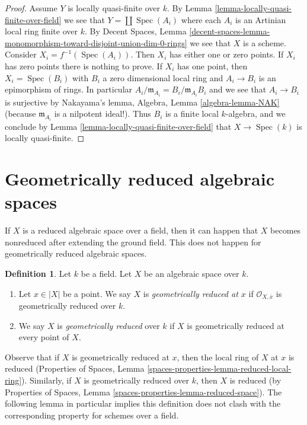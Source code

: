 \documentclass{stacks-project}
\theoremstyle{plain}
\theoremstyle{definition}
\newtheorem{definition}[subsection]{Definition}
\theoremstyle{remark}
\numberwithin{equation}{subsection}
\def\Spec{\mathop{\mathrm{Spec}}}
\begin{document}
\begin{proof}
Assume $Y$ is locally quasi-finite over $k$. By
Lemma \ref{lemma-locally-quasi-finite-over-field}
we see that $Y = \coprod \Spec(A_i)$ where each $A_i$ is an
Artinian local ring finite over $k$. By
Decent Spaces, Lemma
\ref{decent-spaces-lemma-monomorphism-toward-disjoint-union-dim-0-rings}
we see that $X$ is a scheme. Consider $X_i = f^{-1}(\Spec(A_i))$.
Then $X_i$ has either one or zero points. If $X_i$ has zero points there
is nothing to prove. If $X_i$ has one point, then
$X_i = \Spec(B_i)$ with $B_i$ a zero dimensional local ring
and $A_i \to B_i$ is an epimorphism of rings. In particular
$A_i/\mathfrak m_{A_i} = B_i/\mathfrak m_{A_i}B_i$ and we see that
$A_i \to B_i$ is surjective by Nakayama's lemma,
Algebra, Lemma \ref{algebra-lemma-NAK}
(because $\mathfrak m_{A_i}$ is a nilpotent ideal!).
Thus $B_i$ is a finite local $k$-algebra, and we conclude by
Lemma \ref{lemma-locally-quasi-finite-over-field}
that $X \to \Spec(k)$ is locally quasi-finite.
\end{proof}











\section{Geometrically reduced algebraic spaces}
\label{section-geometrically-reduced}

\noindent
If $X$ is a reduced algebraic space over a field, then it can happen that $X$
becomes nonreduced after extending the ground field. This does not happen
for geometrically reduced algebraic spaces.

\begin{definition}
\label{definition-geometrically-reduced}
Let $k$ be a field.
Let $X$ be an algebraic space over $k$.
\begin{enumerate}
\item Let $x \in |X|$ be a point. We say $X$ is
{\it geometrically reduced at $x$} if $\mathcal{O}_{X, \overline{x}}$
is geometrically reduced over $k$.
\item We say $X$ is {\it geometrically reduced} over $k$
if $X$ is geometrically reduced at every point of $X$.
\end{enumerate}
\end{definition}

\noindent
Observe that if $X$ is geometrically reduced at $x$, then the local
ring of $X$ at $x$ is reduced (Properties of Spaces, Lemma
\ref{spaces-properties-lemma-reduced-local-ring}).
Similarly, if $X$ is geometrically reduced over $k$, then $X$ is reduced
(by Properties of Spaces, Lemma \ref{spaces-properties-lemma-reduced-space}).
The following lemma in particular implies this definition does not clash
with the corresponding property for schemes over a field.
\end{document}
